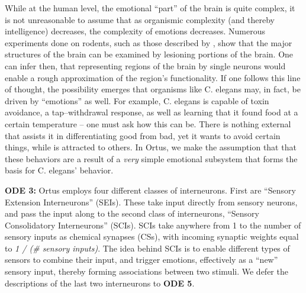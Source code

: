 \documentclass[letterpaper]{article}
\begin{document}
While at the human level, the emotional ``part'' of the brain is quite complex, it is not unreasonable to assume that as organismic complexity (and thereby intelligence) decreases, the complexity of emotions decreases. Numerous experiments done on rodents, such as those described by \citet{Weiner2015}, show that the major structures of the brain can be examined by lesioning portions of the brain. One can infer then, that representing regions of the brain by single neurons would enable a rough approximation of the region's functionality. If one follows this line of thought, the possibility emerges that organisms like C. elegans may, in fact, be driven by ``emotions'' as well. For example, C. elegans is capable of toxin avoidance, a tap--withdrawal response, as well as learning that it found food at a certain temperature \citep{Wicks1996,Xu2012} -- one must ask how this can be. There is nothing external that assists it in differentiating good from bad, yet it wants to avoid certain things, while is attracted to others. In Ortus, we make the assumption that that these behaviors are a result of a \textit{very} simple emotional subsystem that forms the basis for C. elegans' behavior.


\textbf{ODE 3:} Ortus employs four different classes of interneurons. First are ``Sensory Extension Interneurons'' (SEIs). These take input directly from sensory neurons, and pass the input along to the second class of interneurons, ``Sensory Consolidatory Interneurons'' (SCIs).
SCIs take anywhere from 1 to the number of sensory inputs as chemical synapses (CSs), with incoming synaptic weights equal to \textit{1 / (\# sensory inputs)}.
The idea behind SCIs is to enable different types of sensors to combine their input, and trigger emotions, effectively as a ``new'' sensory input, thereby forming associations between two stimuli. We defer the descriptions of the last two interneurons to \textbf{ODE 5}.
\end{document}
